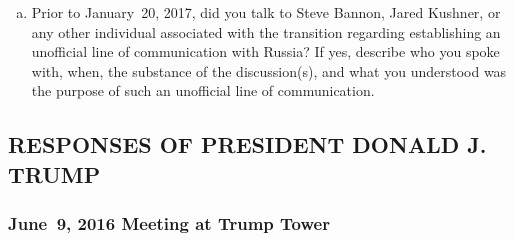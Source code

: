 \begin{enumerate}[a.]
\begin{enumerate}[i.]
\end{enumerate}

\item Prior to January~20, 2017, did you talk to Steve Bannon, Jared Kushner, or any other individual associated with the transition regarding establishing an unofficial line of communication with Russia?
If yes, describe who you spoke with, when, the substance of the discussion(s), and what you understood was the purpose of such an unofficial line of communication.

\end{enumerate}

\subsection{RESPONSES OF PRESIDENT DONALD J. TRUMP}

\subsubsection{June~9, 2016 Meeting at Trump Tower}

